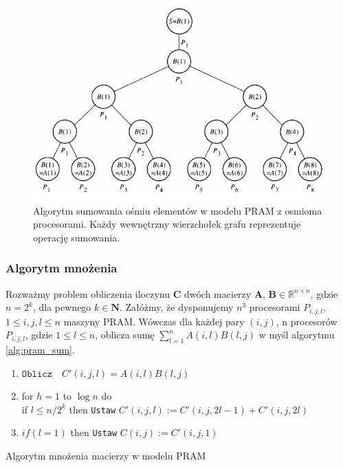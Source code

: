 \documentclass[a4paper,oneside,leqno,12pt]{book}
\theoremstyle{definition}
\theoremstyle{plain}
\theoremstyle{remark}
\begin{document}
\begin{figure}[h]
\centering
\includegraphics[width=34em]{./images/pram_sum}
\caption{Algorytm sumowania ośmiu elementów w modelu PRAM z osmioma procesorami. Każdy wewnętrzny wierzchołek grafu reprezentuje operację sumowania.}
\label{fig:pram_sum}
\end{figure}


\subsubsection{Algorytm mnożenia}
Rozważmy problem obliczenia iloczynu \(\mathbf{C}\) dwóch macierzy \(\mathbf{A}\), \(\mathbf{B}\in\mathbb{R}^{n\times n}\), gdzie \(n=2^k\), dla pewnego \(k\in\mathbf{N}\). Załóżmy, że dysponujemy \(n^3\) procesorami \(P_{i,j,l}\), \(1\leq i, j, l \leq n\) maszyny PRAM. Wówczas dla każdej pary \((i, j)\), n procesorów \(P_{i,j,l}\), gdzie \(1\leq l \leq n\), oblicza sumę \(\sum_{l=1}^{n}A(i,l)B(l,j)\) w myśl algorytmu \ref{alg:pram_sum}.\\

\label{alg:crew_pram_multiplication}
\begin{algorithm}[H]
\begin{enumerate}
 \item \( \mathtt{Oblicz}\quad C'(i,j,l) = A(i,l)B(l,j) \)
 \item for \(h = 1\) to \( \log{n}\) do\\
 if \(l \leq n/2^k\) then \texttt{Ustaw} \(C'(i,j,l):=C'(i,j,2l-1)+C'(i,j,2l)\)
 \item \(if(l=1)\) then \texttt{Ustaw} \(C(i,j):=C'(i,j,1)\)
\end{enumerate}
\caption{Algorytm mnożenia macierzy w modelu PRAM\label{alg:pram_pseudokod}}
\end{algorithm}
\end{document}
